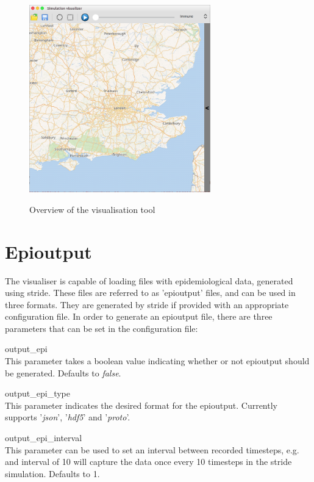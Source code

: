 \begin{figure}[H]
\centering
\includegraphics[width=0.7\textwidth,keepaspectratio]{images/overview.png}
\label{fig:screenshot_overview}
\caption{Overview of the visualisation tool}
\end{figure}

\section{Epioutput}
\label{section:epioutput}
The visualiser is capable of loading files with epidemiological data, generated using stride. These files are referred to as 'epioutput' files, and can be used in three formats. They are generated by stride if provided with an appropriate configuration file. In order to generate an epioutput file, there are three parameters that can be set in the configuration file:

\begin{compactdesc}
\item [output\_epi] \ \\
    This parameter takes a boolean value indicating whether or not epioutput should be generated. Defaults to \emph{false}.
\item [output\_epi\_type] \ \\
    This parameter indicates the desired format for the epioutput. Currently supports '\emph{json}', '\emph{hdf5}' and '\emph{proto}'.
\item [output\_epi\_interval] \ \\
    This parameter can be used to set an interval between recorded timesteps, e.g. and interval of 10 will capture the data once every 10 timesteps in the stride simulation. Defaults to 1.
\end{compactdesc}

